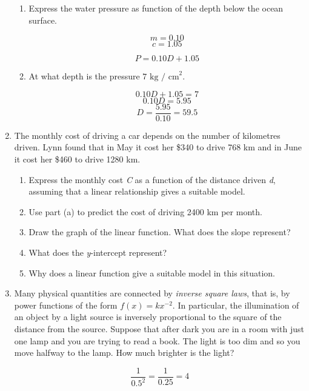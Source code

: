 \documentclass{article}
\begin{document}
\begin{enumerate}
			\begin{enumerate}
			
				\item Express the water pressure as function of the depth below the ocean surface.
				
					$$m = 0.10$$
					$$c = 1.05$$
					
					$$P = 0.10D + 1.05$$
					
				\item At what depth is the pressure $7 \text{ kg / cm}^{2}$.
				
					$$0.10D + 1.05 = 7$$
					$$0.10D = 5.95$$
					$$D = \frac{5.95}{0.10} = 59.5$$
			\end{enumerate}
			
		\item The monthly cost of driving a car depends on the number of kilometres driven. Lynn found that in
			May it cost her \$340 to drive 768 km and in June it cost her \$460 to drive 1280 km.
			
			\begin{enumerate}
				\item Express the monthly cost \emph{C} as a function of the distance driven \emph{d},
					assuming that a linear relationship gives a suitable model.
					
				\item Use part (a) to predict the cost of driving 2400 km per month.
				
				\item Draw the graph of the linear function. What does the slope represent?
				
				\item What does the \emph{y}-intercept represent?
				
				\item Why does a linear function give a suitable model in this situation.
			\end{enumerate}
			
		\item Many physical quantities are connected by \emph{inverse square laws}, that is, by power functions
			of the form $f(x) = kx^{-2}$. In particular, the illumination of an object by a light source is inversely
			proportional to the square of the distance from the source. Suppose that after dark you are in a room
			with just one lamp and you are trying to read a book. The light is too dim and so you move halfway to
			the lamp. How much brighter is the light?
			
			$$\frac{1}{0.5^2} = \frac{1}{0.25} = 4$$
		

\end{enumerate}
\end{document}
